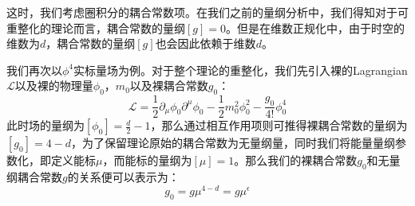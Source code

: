 这时，我们考虑圈积分的耦合常数项。在我们之前的量纲分析中，我们得知对于可重整化的理论而言，耦合常数的量纲$[g]=0$。但是在维数正规化中，由于时空的维数为$d$，耦合常数的量纲$[g]$也会因此依赖于维数$d$。

我们再次以$\phi^4$实标量场为例。对于整个理论的重整化，我们先引入裸的Lagrangian$\mathcal{L}$以及裸的物理量$\phi_0$，$m_0$以及裸耦合常数$g_0$：
\begin{equation}
\mathscr{L}=\frac{1}{2}\partial_\mu\phi_0\partial^\mu\phi_0-\frac{1}{2}m_0^2\phi_0^2-\frac{g_0}{4!}\phi_0^4
\end{equation}
此时场的量纲为$[\phi_0]=\frac{d}{2}-1$，那么通过相互作用项则可推得裸耦合常数的量纲为$[g_0]=4-d$，为了保留理论原始的耦合常数为无量纲量，同时我们将能量量纲参数化，即定义能标$\mu$，而能标的量纲为$[\mu]=1$。那么我们的裸耦合常数$g_0$和无量纲耦合常数$g$的关系便可以表示为：
\begin{equation}
g_0=g\mu^{4-d}=g\mu^{\epsilon}
\end{equation}


